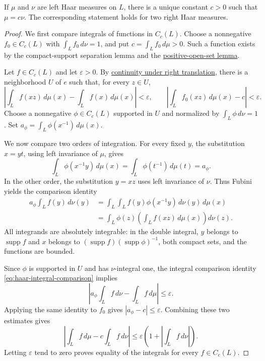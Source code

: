 \begin{theorem}\label{measure.haar-uniqueness}
If $\mu$ and $\nu$ are left Haar measures on $L$, there is a unique constant $c>0$ such that $\mu=c\nu$. The corresponding statement holds for two right Haar measures.
\end{theorem}

\begin{proof}
We first compare integrals of functions in $C_c(L)$. Choose a nonnegative $f_0\in C_c(L)$ with $\int_L f_0\,d\nu=1$, and put $c=\int_L f_0\,d\mu>0$. Such a function exists by the compact-support separation lemma and the \hyperref[measure.haar-positive-open]{positive-open-set lemma}.

Let $f\in C_c(L)$ and let $\varepsilon>0$. By \hyperref[measure.haar-translation-continuity]{continuity under right translation}, there is a neighborhood $U$ of $e$ such that, for every $z\in U$,
\[
 \left|\int_L f(xz)\,d\mu(x)-\int_L f(x)\,d\mu(x)\right|<\varepsilon,
 \qquad
 \left|\int_L f_0(xz)\,d\mu(x)-c\right|<\varepsilon.
\]
Choose a nonnegative $\phi\in C_c(L)$ supported in $U$ and normalized by $\int_L\phi\,d\nu=1$. Set $a_\phi=\int_L\phi(x^{-1})\,d\mu(x)$.

We now compare two orders of integration. For every fixed $y$, the substitution $x=yt$, using left invariance of $\mu$, gives
\[
 \int_L\phi(x^{-1}y)\,d\mu(x)
 =\int_L\phi(t^{-1})\,d\mu(t)=a_\phi.
\]
In the other order, the substitution $y=xz$ uses left invariance of $\nu$. Thus Fubini yields the comparison identity
\begin{equation}\label{eq:haar-integral-comparison}
 \begin{aligned}
 a_\phi\int_L f(y)\,d\nu(y)
 &=\int_L\int_L f(y)\phi(x^{-1}y)\,d\nu(y)\,d\mu(x)\\
 &=\int_L\phi(z)\left(\int_L f(xz)\,d\mu(x)\right)d\nu(z).
 \end{aligned}
\end{equation}
All integrands are absolutely integrable: in the double integral, $y$ belongs to $\operatorname{supp}f$ and $x$ belongs to $(\operatorname{supp}f)(\operatorname{supp}\phi)^{-1}$, both compact sets, and the functions are bounded.

Since $\phi$ is supported in $U$ and has $\nu$-integral one, the integral comparison identity \eqref{eq:haar-integral-comparison} implies
\[
 \left|a_\phi\int_L f\,d\nu-\int_L f\,d\mu\right|\leq\varepsilon.
\]
Applying the same identity to $f_0$ gives $|a_\phi-c|\leq\varepsilon$. Combining these two estimates gives
\[
 \left|\int_L f\,d\mu-c\int_L f\,d\nu\right|
 \leq\varepsilon\left(1+\left|\int_L f\,d\nu\right|\right).
\]
Letting $\varepsilon$ tend to zero proves equality of the integrals for every $f\in C_c(L)$.


\end{proof}

